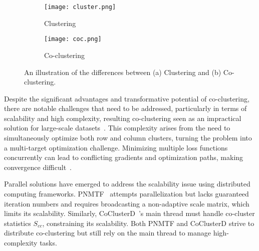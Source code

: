 \documentclass[journal]{IEEEtran}
\renewcommand{\cite}[1]{~\autocite{#1}}
\begin{document}
\begin{figure}[htbp]
  \centering
  \begin{subfigure}[b]{0.22\textwidth}
    \texttt{[image: cluster.png]}
    \caption{Clustering}
    \label{fig:cluster}
  \end{subfigure}
  \hfill
  \begin{subfigure}[b]{0.22\textwidth}
    \texttt{[image: coc.png]}
    \caption{Co-clustering}
    \label{fig:cocluster}
  \end{subfigure}
  \caption{An illustration of the differences between (a) Clustering and (b) Co-clustering.}
  \label{fig:cocomparison}
\end{figure}

Despite the significant advantages and transformative potential of co-clustering, there are notable challenges that need to be addressed, particularly in terms of scalability and high complexity, resulting co-clustering seen as an impractical solution for large-scale datasets\cite{cheng2015CoClusterDDistributedFramework}.
This complexity arises from the need to simultaneously optimize both row and column clusters, turning the problem into a multi-target optimization challenge. Minimizing multiple loss functions concurrently can lead to conflicting gradients and optimization paths, making convergence difficult\cite{coello2007EvolutionaryAlgorithmsSolving}.

Parallel solutions have emerged to address the scalability issue using distributed computing frameworks. PNMTF\cite{chen2023ParallelNonnegativeMatrix} attempts parallelization but lacks guaranteed iteration numbers and requires broadcasting a non-adaptive scale matrix, which limits its scalability. Similarly, CoClusterD\cite{cheng2015CoClusterDDistributedFramework}'s main thread must handle co-cluster statistics \(S_{cc}\), constraining its scalability. Both PNMTF and CoClusterD strive to distribute co-clustering but still rely on the main thread to manage high-complexity tasks.
\end{document}
